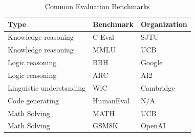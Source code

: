 \documentclass[lettersize,journal]{IEEEtran}
\begin{document}
\begin{table}[h!]
\centering
\begin{threeparttable}

\caption{Common Evaluation Benchmarks}
\label{tab:benchmarks}


\begin{tabular}{lll}
\toprule
\textbf{Type} & \textbf{Benchmark} & \textbf{Organization} \\
\midrule
Knowledge reasoning                          & C-Eval~\cite{CEval}                          & SJTU                                    \\
Knowledge reasoning                          & MMLU~\cite{hendrycks2021measuring,MMLU2}     & UCB                                  \\
Logic reasoning                              & BBH~\cite{Bench_BBH}                         & Google                                   \\
Logic reasoning                              & ARC~\cite{ARC_c}                             & AI2                                  \\
Linguistic understanding                     & WiC~\cite{bench_WiC}                         & Cambridge                                   \\
Code generating                              & HumanEval~\cite{HumanEval}                   & N/A                                  \\
Math Solving                                        & MATH~\cite{bench_math}                       & UCB                                   \\
Math Solving    & GSM8K~\cite{cobbe2021training}               & OpenAI                                  \\ 
\bottomrule
\end{tabular}


\end{threeparttable}

\end{table}
\end{document}
